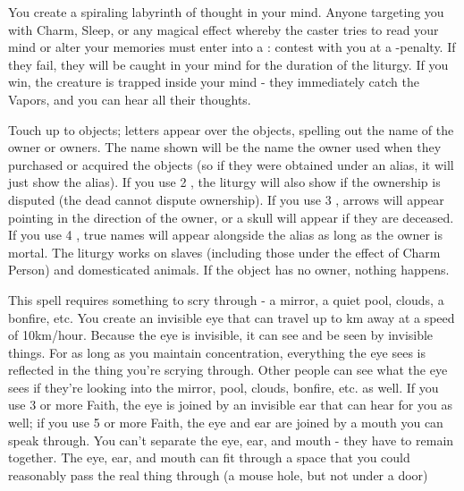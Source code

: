 {\LITURGY [
  Name= Labyrinth,
  Link=thoth-liturgy-labyrinth,
  Paradigm= Mind ,
  Save=  N ,
  Duration= Combat or \SUMDICE Minutes ,
  Counter=  n/a  ,
  Keywords= None ,
  Target=   Self
]



You create a spiraling labyrinth of thought in your mind.  Anyone targeting you with Charm, Sleep, or any magical effect whereby the caster tries to read your mind or alter your memories must enter into a \RB : \FOC contest with you at a -\DICE penalty.  If they fail, they will be caught in your mind for the duration of the liturgy.  If you win, the creature is trapped inside your mind - they immediately catch the Vapors, and you can hear all their thoughts.

\LITURGY [
  Name= Reveal Ownership,
  Link=thoth-liturgy-reveal-ownership,
  Paradigm= Prophesy ,
  Save=  N ,
  Duration= \SUMDICE Minutes ,
  Counter=  n/a  ,
  Keywords= Splittable ,
  Target=   Close objects
]



Touch up to \DICE objects; letters appear over the objects, spelling out the name of the owner or owners.  The name shown will be the name the owner used when they purchased or acquired the objects (so if they were obtained under an alias, it will just show the alias). 
If you use 2 \DICE, the liturgy will also show if the ownership is disputed (the dead cannot dispute ownership).  If you use 3 \DICE, arrows will appear pointing in the direction of the owner, or a skull will appear if they are deceased.  If you use 4 \DICE, true names will appear alongside the alias as long as the owner is mortal.
The liturgy works on slaves (including those under the effect of Charm Person) and domesticated animals.  If the object has no owner, nothing happens.

\LITURGY [
  Name= Scry,
  Link=thoth-liturgy-scry,
  Paradigm= Prophesy ,
  Save=  N ,
  Duration= Concentration ,
  Counter=  n/a  ,
  Keywords= None ,
  Target=   Something up to \DICE km away
]



This spell requires something to scry through - a mirror, a quiet pool, clouds, a bonfire, etc.  You create an invisible eye that can travel up to \DICE km away at a speed of 10km/hour.  Because the eye is invisible, it can see and be seen by invisible things.  For as long as you maintain concentration, everything the eye sees is reflected in the thing you're scrying through.  Other people can see what the eye sees if they're looking into the mirror, pool, clouds, bonfire, etc.  as well. 
If you use 3 or more Faith, the eye is joined by an invisible ear that can hear for you as well; if you use 5 or more Faith, the eye and ear are joined by a mouth you can speak through.  You can't separate the eye, ear, and mouth - they have to remain together.  The eye, ear, and mouth can fit through a space that you could reasonably pass the real thing through (a mouse hole, but not under a door)


}
